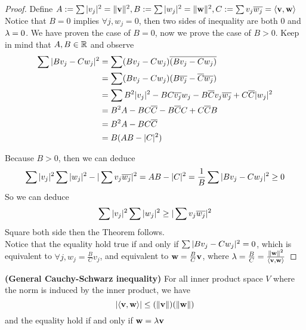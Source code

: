 \documentclass{report}
\begin{document}
\begin{proof}
Define $A:=\sum |v_j|^2=\| \textbf{v} \|^2,B:=\sum |w_j|^2=\| \textbf{w} \|^2,C:=\sum v_j\overline{w_j}=\langle \textbf{v},\textbf{w} \rangle$\\

Notice that $B=0$ implies $\forall j,w_j=0$, then two sides of inequality are both $0$ and  $\lambda=0$. We have proven the case of $B=0$, now we prove the case of  $B>0$. Keep in mind that $A,B\in\mathbb{R}$ and observe
\begin{align}
\sum |Bv_j-Cw_j|^2&=\sum (Bv_j-Cw_j)\overline{(Bv_j-Cw_j)}\\
&=\sum (Bv_j-Cw_j)(B\overline{v_j}-\overline{C}\overline{w_j})\\
&=\sum B^2|v_j|^2-BC\overline{v_j}w_j-B\overline{C}v_j\overline{w_j}+C\overline{C}|w_j|^2\\
&=B^2A-BC\overline{C}-B\overline{C}C+C\overline{C}B\\
&=B^2A-BC\overline{C}\\
&=B(AB-|C|^2) 
\end{align}

Because $B>0$, then we can deduce
\begin{equation}
\sum |v_j|^2\sum |w_j|^2 - |\sum v_j\overline{w_j}|^2=AB-|C|^2=\frac{1}{B}\sum |Bv_j-Cw_j|^2\geq 0
\end{equation}
So we can deduce
\begin{equation}
\sum |v_j|^2\sum |w_j|^2\geq |\sum v_j\overline{w_j}|^2
\end{equation}
Square both side then the Theorem follows.\\

Notice that the equality hold true if and only if $\sum |Bv_j-Cw_j|^2=0$, which is equivalent to $\forall j, w_j=\frac{B}{C}v_j$, and equivalent to $\textbf{w}=\frac{B}{C}\textbf{v}$, where $\lambda =\frac{B}{C}=\frac{\| \textbf{w} \|^2}{\langle \textbf{v},\textbf{w} \rangle}$
\end{proof}
\begin{theorem}
\label{1.6.12}
\textbf{(General Cauchy-Schwarz inequality)} For all inner product space $V$ where the norm is induced by the inner product, we have
\begin{equation}
|\langle \textbf{v},\textbf{w} \rangle|\leq (\| \textbf{v} \|)(\| \textbf{w} \|)
\end{equation}
and the equality hold if and only if  $\textbf{w}=\lambda \textbf{v}$
\end{theorem}
\end{document}
